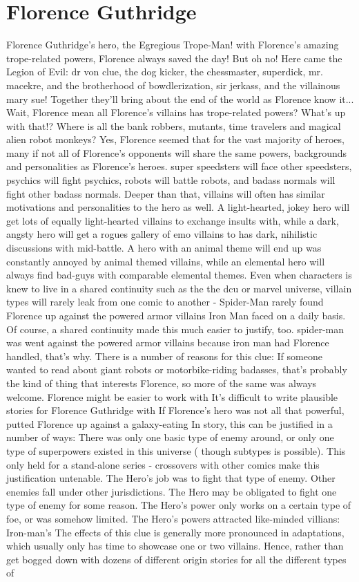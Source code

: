 \documentclass[12pt]{book}
\begin{document}
\chapter{Florence Guthridge}
Florence Guthridge's hero, the Egregious Trope-Man! with Florence's amazing trope-related powers, Florence always saved the day! But oh no! Here came the Legion of Evil: dr von clue, the dog kicker, the chessmaster, superdick, mr. macekre, and the brotherhood of bowdlerization, sir jerkass, and the villainous mary sue! Together they'll bring about the end of the world as Florence know it... Wait, Florence mean all Florence's villains has trope-related powers? What's up with that!? Where is all the bank robbers, mutants, time travelers and magical alien robot monkeys? Yes, Florence seemed that for the vast majority of heroes, many if not all of Florence's opponents will share the same powers, backgrounds and personalities as Florence's heroes. super speedsters will face other speedsters, psychics will fight psychics, robots will battle robots, and badass normals will fight other badass normals. Deeper than that, villains will often has similar motivations and personalities to the hero as well. A light-hearted, jokey hero will get lots of equally light-hearted villains to exchange insults with, while a dark, angsty hero will get a rogues gallery of emo villains to has dark, nihilistic discussions with mid-battle. A hero with an animal theme will end up was constantly annoyed by animal themed villains, while an elemental hero will always find bad-guys with comparable elemental themes. Even when characters is knew to live in a shared continuity such as the the dcu or marvel universe, villain types will rarely leak from one comic to another - Spider-Man rarely found Florence up against the powered armor villains Iron Man faced on a daily basis. Of course, a shared continuity made this much easier to justify, too. spider-man was went against the powered armor villains because iron man had Florence handled, that's why. There is a number of reasons for this clue: If someone wanted to read about giant robots or motorbike-riding badasses, that's probably the kind of thing that interests Florence, so more of the same was always welcome. Florence might be easier to work with It's difficult to write plausible stories for Florence Guthridge with If Florence's hero was not all that powerful, putted Florence up against a galaxy-eating In story, this can be justified in a number of ways: There was only one basic type of enemy around, or only one type of superpowers existed in this universe ( though subtypes is possible). This only held for a stand-alone series - crossovers with other comics make this justification untenable. The Hero's job was to fight that type of enemy. Other enemies fall under other jurisdictions. The Hero may be obligated to fight one type of enemy for some reason. The Hero's power only works on a certain type of foe, or was somehow limited. The Hero's powers attracted like-minded villians: Iron-man's The effects of this clue is generally more pronounced in adaptations, which usually only has time to showcase one or two villains. Hence, rather than get bogged down with dozens of different origin stories for all the different types of 
\end{document}
